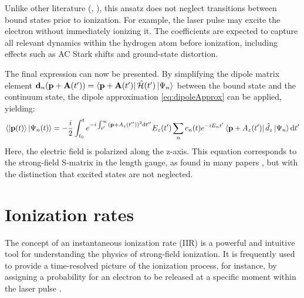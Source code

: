 Unlike other literature (\cite{Theory_NPS}, \cite{Ivanov20012005}), this ansatz does not neglect transitions between bound states prior to ionization.
For example, the laser pulse may excite the electron without immediately ionizing it.
The coefficients are expected to capture all relevant dynamics within the hydrogen atom before ionization, including effects such as AC Stark shifts and ground-state distortion.

The final expression can now be presented.
By simplifying the dipole matrix element $\mathbf{d}_n(\mathbf{p}+\mathbf{A}(t')) = \bra{\mathbf{p}+\mathbf{A}(t')}\hat{\mathcal{H}}(t')\ket{\Psi_n}$ between the bound state and the continuum state, the dipole approximation \eqref{eq:dipoleApprox} can be applied, yielding:
\begin{equation*}
    \braket{\ket{\mathbf{p}(t)}|\Psi_n(t)} = -\frac{i}{2}\int_{t_0}^{t} e^{-i \int_{t'}^{\infty} (\mathbf{p} + A_z(t''))^2 \mathrm{d} t''}E_z(t')\sum_{n}c_n(t)e^{-iE_nt'}\bra{\mathbf{p}+A_z(t')}\hat{d}_z\ket{\Psi_n} \mathrm{d} t'       \label{eq:smatrix}
\end{equation*}
Here, the electric field is polarized along the z-axis.
This equation corresponds to the strong-field S-matrix in the length gauge, as found in many papers \cite{Theory_NPS}, but with the distinction that excited states are not neglected.




\section{Ionization rates}



The concept of an instantaneous ionization rate (IIR) is a powerful and intuitive tool for understanding the physics of strong-field ionization. It is frequently used to provide a time-resolved picture of the ionization process, for instance, by assigning a probability for an electron to be released at a specific moment within the laser pulse \cite{Ivanov2018}.


